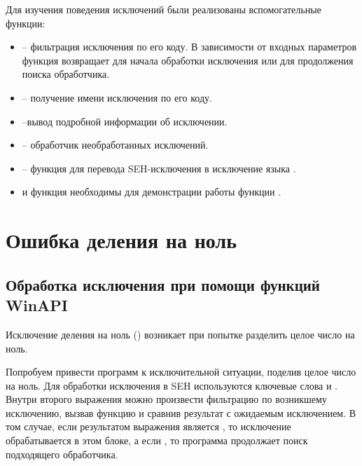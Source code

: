 Для изучения поведения исключений были реализованы вспомогательные функции:
\begin{itemize}
	\item {} -- фильтрация исключения по его коду. В зависимости от входных параметров функция возвращает  для начала обработки исключения или  для продолжения поиска обработчика.
	\item {} -- получение имени исключения по его коду.
	\item {} --вывод подробной информации об исключении.
	\item {} -- обработчик необработанных исключений.
	\item {} -- функция для перевода SEH-исключения в исключение языка .
	\item {} и функция  необходимы для демонстрации работы функции .
\end{itemize}





\newpage

\section{Ошибка деления на ноль}

\subsection{Обработка исключения при помощи функций WinAPI}

Исключение деления на ноль () возникает при попытке разделить целое число на ноль.

Попробуем привести программ к исключительной ситуации, поделив целое число на ноль. Для обработки исключения в SEH используются ключевые слова  и . Внутри второго выражения можно произвести фильтрацию по возникшему исключению, вызвав функцию  и сравнив результат с ожидаемым исключением. В том случае, если результатом выражения является , то исключение обрабатывается в этом блоке, а если , то программа продолжает поиск подходящего обработчика.

